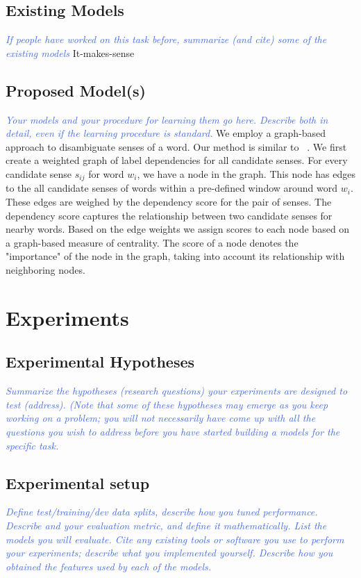 \documentclass[11pt,letterpaper]{article}
\newcommand{\blue}[1]{\textcolor{RoyalBlue}{#1}}
\newcommand{\instructions}[1]{\blue{\textit{#1}}}
\begin{document}
\subsection{Existing Models}
\label{sec:existing-models}
\instructions{If people have worked on this task before, summarize (and cite) some of the existing models} 
It-makes-sense
\subsection{Proposed Model(s)}
\label{sec:proposed-models}
\instructions{Your models and your procedure for learning them go here. Describe both in detail, even if the learning procedure is standard.}
We employ a graph-based approach to disambiguate senses of a word. Our method is similar to ~\cite{Sinha}. We first create a weighted graph of label dependencies for all candidate senses. For every candidate sense $s_{ij}$ for word $w_i$, we have a node in the graph. This node has edges to the all candidate senses of words within a pre-defined window around word $w_i$. These edges are weighed by the dependency score for the pair of senses. The dependency score captures the relationship between two candidate senses for nearby words. Based on the edge weights we assign scores to each node based on a graph-based measure of centrality. The score of a node denotes the "importance" of the node in the graph, taking into account its relationship with neighboring nodes.


\section{Experiments}
\label{sec:experiments}

\subsection{Experimental Hypotheses}
\label{sec:exper-hypoth}
\instructions{Summarize the hypotheses (research questions) your experiments are designed to test (address). (Note that some of these hypotheses may emerge as you keep working on a problem; you will not necessarily have come up with all the questions you wish to address before you have started building a models for the specific task.}

\subsection{Experimental setup}
\label{sec:experimental-setup}
\instructions{Define test/training/dev data splits, describe how you tuned performance. Describe and your evaluation metric, and define it mathematically.
List the models you will evaluate. Cite any existing tools or software you use to perform your experiments; describe what you implemented yourself. Describe how you obtained the features used by each of the models.}
\end{document}

